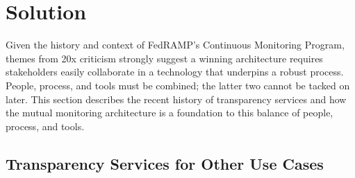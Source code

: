 \documentclass{jdf}
\begin{document}
\section{Solution}

Given the history and context of FedRAMP's Continuous Monitoring Program, themes from 20x criticism strongly suggest a winning architecture requires stakeholders easily collaborate in a technology that underpins a robust process. People, process, and tools must be combined; the latter two cannot be tacked on later. This section describes the recent history of transparency services and how the mutual monitoring architecture is a foundation to this balance of people, process, and tools.

\subsection{Transparency Services for Other Use Cases} \label{use_cases}
\end{document}
